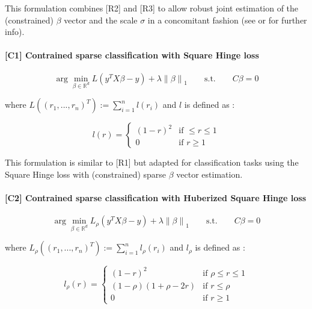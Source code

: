 \documentclass[article]{jss}
\newcommand{\norm}[1]{\left\lVert#1\right\rVert}
\begin{document}
This formulation combines [R2] and [R3] to allow robust joint estimation of the (constrained) $\beta$ vector and the scale $\sigma$ in a concomitant fashion (see \cite{Compositional} or \cite{combettes2019regression} for further info).

\paragraph{[C1] Contrained sparse classification with Square Hinge loss}

\begin{equation*}
    \arg \min_{\beta \in \mathbb{R}^d} L(y^T X\beta - y) + \lambda \norm{\beta}_1 \qquad \mbox{s.t.} \qquad  C\beta = 0
\end{equation*}

where $L \left((r_1,...,r_n)^T \right) := \sum_{i=1}^n l(r_i)$ and $l$ is defined as :

\begin{equation*}
l(r) = \begin{cases} (1-r)^2 &\mbox{if } \leq r \leq 1 \\ 0 &\mbox{if } r \geq 1 \end{cases}
\end{equation*}


This formulation is similar to [R1] but adapted for classification tasks using the Square Hinge loss with (constrained) sparse $\beta$ vector estimation.

\paragraph{[C2] Contrained sparse classification with Huberized Square Hinge loss}

\begin{equation*}
    \arg \min_{\beta \in \mathbb{R}^d} L_{\rho}(y^T X\beta - y) + \lambda \norm{\beta}_1 \qquad \mbox{s.t.} \qquad  C\beta = 0
\end{equation*}

where $L_{\rho} \left((r_1,...,r_n)^T \right) := \sum_{i=1}^n l_{\rho}(r_i)$ and $l_{\rho}$ is defined as :

\begin{equation*}
l_{\rho}(r) = \begin{cases} (1-r)^2 &\mbox{if } \rho \leq r \leq 1 \\ (1-\rho)(1+\rho-2r) &\mbox{if } r \leq \rho \\ 0 &\mbox{if } r \geq 1 \end{cases}
\end{equation*}
\end{document}
